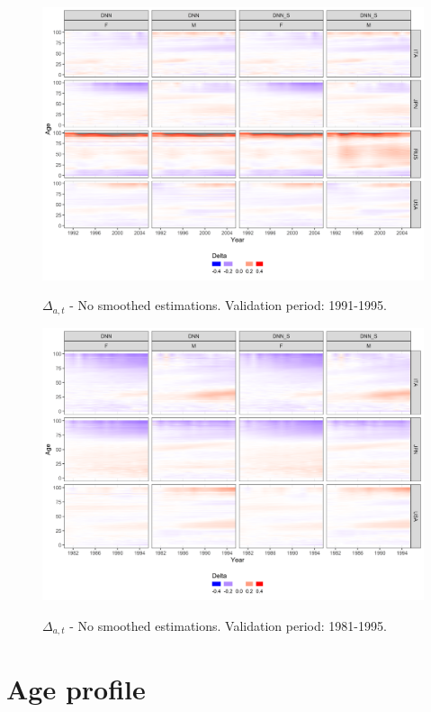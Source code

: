 \documentclass[a4,11pt]{article}
\begin{document}
\begin{figure}[H]
	\centering
	\includegraphics[width=1\linewidth]{no_smooth_1960}\\
	 \caption{$\Delta_{a,t}$ - No smoothed estimations. Validation period: 1991-1995.}
	 
\end{figure}


\begin{figure}[H]
	\centering
	\includegraphics[width=1\linewidth]{no_smooth_1950}\\
	 \caption{$\Delta_{a,t}$ - No smoothed estimations. Validation period: 1981-1995.}
\end{figure}




\section{Age profile}
\end{document}
